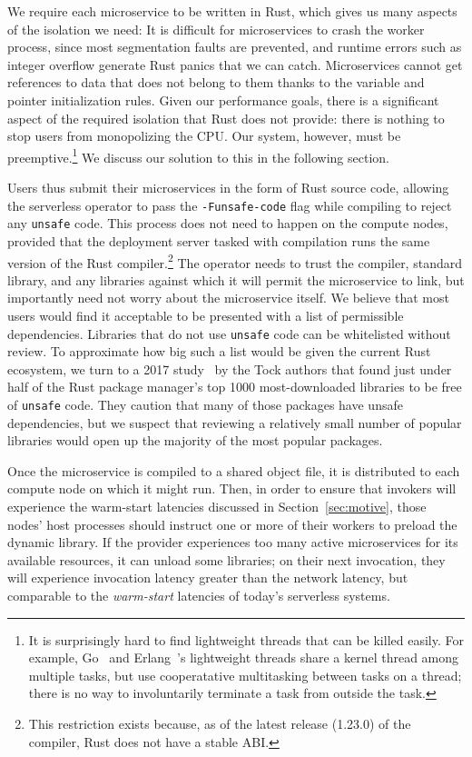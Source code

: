 We require each microservice to be written in Rust, which gives us many aspects of
the isolation we need:  It is difficult for microservices to crash the worker process,
since most segmentation faults are prevented, and runtime errors such as integer
overflow generate Rust panics that we can catch.  Microservices cannot get references
to data that does not belong to them thanks to the variable and pointer initialization
rules.  
Given our performance goals, there is a significant aspect of the
required isolation that Rust does not provide: there is nothing to stop users from
monopolizing the CPU\@.
Our system, however, must be preemptive.\footnote{It is surprisingly hard to find lightweight
  threads that can be killed easily.  For example, 
Go~\cite{www-golang} and Erlang~\cite{www-erlang}'s lightweight threads
share a kernel thread among multiple tasks, but use cooperatative multitasking
between tasks on a thread;  there is no way to involuntarily terminate a task
from outside the task.}  We discuss our solution to this in the following
section.

Users thus submit their microservices in the form of Rust source code, allowing the
serverless operator to pass the \texttt{-Funsafe-code} flag while compiling to reject
any \texttt{unsafe} code.  This process does not need to happen on the compute
nodes, provided that the deployment server tasked with compilation runs the same version
of the Rust compiler.\footnote{This restriction exists because, as of the latest
release (1.23.0) of the compiler, Rust does not have a stable ABI.}  The operator
needs to trust the compiler, standard library, and any libraries against which it
will permit the microservice to link, but importantly need not worry about the
microservice itself.  We believe that most users would find it acceptable to be
presented with a list of permissible dependencies.  Libraries that do not use
\texttt{unsafe} code can be whitelisted without review.  To approximate how big
such a list would be given the current Rust ecosystem, we turn to a 2017
study~\cite{www-cratesio-unsafe} by the Tock authors that found just under half of
the Rust package manager's top 1000 most-downloaded libraries to be free of
\texttt{unsafe} code.  They caution that many of those packages have unsafe
dependencies, but we suspect that reviewing a relatively small number of popular
libraries would open up the majority of the most popular packages.

Once the microservice is compiled to a shared object file, it is distributed to
each compute node on which it might run.  Then, in order to ensure that invokers will
experience the warm-start latencies discussed in Section~\ref{sec:motive}, those
nodes' host processes should instruct one or more of their workers to preload the
dynamic library.  If the provider experiences too many active
microservices for its available resources, it can unload some libraries; on their
next invocation, they will experience invocation latency greater than the network
latency, but comparable to the \textit{warm-start} latencies of today's serverless
systems.
